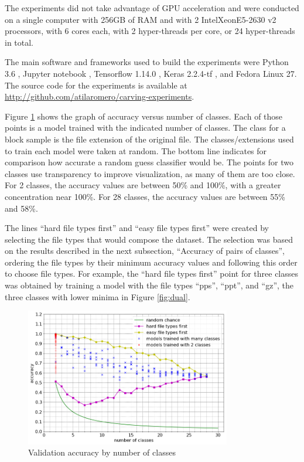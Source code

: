 The experiments did not take advantage of GPU acceleration and were  conducted on a single computer with 256GB of RAM and with 2 Intel\textregistered Xeon\textregistered E5-2630 v2 processors, with 6 cores each, with 2 hyper-threads per core, or 24 hyper-threads in total. 


The main software and frameworks used to build the experiments were Python 3.6 {\color{red}
\cite{rossum_python_2019}, Jupyter notebook \cite{perez_jupyter_2019}, Tensorflow 1.14.0 \cite{google_brain_tensorflow_2019}, Keras 2.2.4-tf \cite{chollet_keras_2019}}, and Fedora Linux 27.
The source code for the experiments is available at \sloppy\url{http://github.com/atilaromero/carving-experiments}.


Figure \ref{fig:nclasses} shows the graph of accuracy versus number of classes.  Each of those points is a model trained with the indicated number of classes. The class for a block sample is the file extension of the original file. The classes/extensions used to train each model were taken at random. The bottom line indicates for comparison how accurate a random guess classifier would be. The points for two classes use transparency to improve visualization, as many of them are too close. For 2 classes, the accuracy values are between 50\% and 100\%, with a greater concentration near 100\%. For 28 classes, the accuracy values are between 55\% and 58\%.

The lines ``hard file types first'' and ``easy file types first'' were created by selecting the file types that would compose the dataset. The selection was based on the results described in the next subsection, ``Accuracy of pairs of classes'', ordering the file types by their minimum accuracy values and following this order to choose file types. For example, the ``hard file types first'' point for three classes was obtained by training a model with the file types ``pps'', ``ppt'', and ``gz'', the three classes with lower minima in Figure \ref{fig:dual}.

\noindent
\begin{figure}[htb!]
\centering\includegraphics[width=0.8\textwidth]{content/nclasses.png}
\caption{\label{fig:nclasses}Validation accuracy by number of classes}%
\end{figure}

